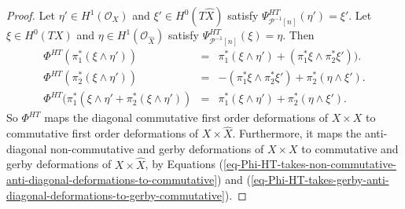 \documentclass[12pt]{amsart}
\newcommand{\hide}[1]{}
\numberwithin{equation}{subsection}
\theoremstyle{plain}
\theoremstyle{definition}
\newtheorem{rem}[thm]{Remark}
\renewcommand{\P}{{\mathcal P}}
\newcommand{\StructureSheaf}[1]{{\mathcal O}_{#1}}
\newcommand{\Contract}{\rfloor}
\begin{document}
\begin{proof}
Let $\eta'\in H^1(\StructureSheaf{X})$ and $\xi'\in H^0(T\hat{X})$ satisfy $\Psi_{\P^{-1}[n]}^{HT}(\eta')=\xi'$. 
Let $\xi\in H^0(TX)$ and $\eta\in H^1(\StructureSheaf{\hat{X}})$ satisfy $\Psi_{\P^{-1}[n]}^{HT}(\xi)=\eta$.
Then
\begin{eqnarray*}
\Phi^{HT}(\pi_1^*(\xi\wedge\eta'))&=& \pi_1^*(\xi\wedge\eta')+(\pi_1^*\xi\wedge\pi_2^*\xi')).
\\
\Phi^{HT}(\pi_2^*(\xi\wedge\eta'))&=&-(\pi_1^*\xi\wedge\pi_2^*\xi')+\pi_2^*(\eta\wedge\xi').
\\
\Phi^{HT}(\pi_1^*(\xi\wedge\eta'+\pi_2^*(\xi\wedge\eta'))&=&\pi_1^*(\xi\wedge\eta')+\pi_2^*(\eta\wedge\xi').
\end{eqnarray*}
So $\Phi^{HT}$ maps the diagonal commutative first order deformations of $X\times X$ to commutative first order deformations of $X\times\hat{X}$. Furthermore, it maps the anti-diagonal non-commutative and gerby deformations of $X\times X$ to
commutative and gerby deformations of $X\times\hat{X}$, by Equations 
(\ref{eq-Phi-HT-takes-non-commutative-anti-diagonal-deformations-to-commutative}) and 
(\ref{eq-Phi-HT-takes-gerby-anti-diagonal-deformations-to-gerby-commutative}).
\end{proof}

\hide{
\begin{rem}
\label{rem-Orlov's-equivalence-maps-diagonal-deformations-to-commutative-gerby-ones}
The appearance of the anti-diagonal embedding in Lemma \ref{lemma-Orlov's-equivalence-maps-diagonal-deformations-to-commutative-gerby-ones} is explained as follows.
Let $(\alpha,\beta,\gamma)$ be an element of $H^2(\StructureSheaf{X}\oplus H^1(TX)\oplus H^0(\wedge^2TX)$.
Then $(\alpha,\beta,\gamma)$ annihilates $ch(F)$, if and only if $(-\alpha,\beta,-\gamma)$ annihilates $ch(F^\vee)$,
since $ch_{k}(F^\vee)=(-1)^kch_{k}(F)$ and
\begin{eqnarray*}
(\alpha,\beta,\gamma)\Contract ch(F) &=&
\alpha\Contract ch_0(F)+\beta\Contract ch_1(F)+\gamma\Contract ch_2(F) +
\\ 
&&
\alpha\Contract ch_1(F)+\beta\Contract ch_2(F)+\gamma\Contract ch_3(F),
\end{eqnarray*}
where the sum in the first row is in $H^{0,2}(X)$ and the sum in the second row is in $H^{1,3}(X)$. 
\end{rem}
}
\end{document}

